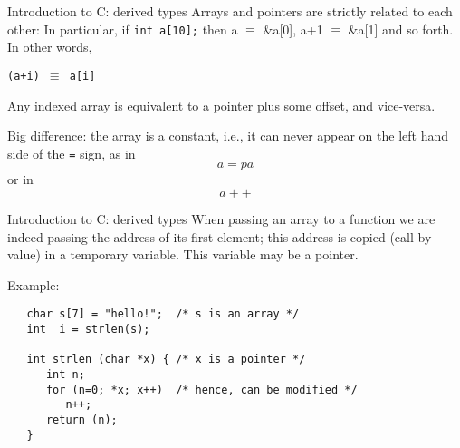 \begin{frame}[fragile]{Introduction to C: derived types}
Arrays and pointers are strictly related to each other:
In particular, if {\tt int a[10];}
then a $\equiv$ \&a[0], a+1 $\equiv$ \&a[1] and so forth.
In other words,
\begin{center}\tt *(a+i) $\equiv$ a[i] \end{center}


\vspace{20pt}

Any indexed array is equivalent to
a pointer plus some offset, and vice-versa.


\vspace{20pt}

Big difference: the array is a constant, i.e., it can never 
appear on the left hand side of the \verb"=" sign, as in
$$a=pa$$
or in
$$a++$$

\end{frame}
\begin{frame}[fragile]{Introduction to C: derived types}
When passing an array to a function
we are indeed passing the address of its first element; this
address is copied 
(call-by-value) in a temporary variable. This variable may be
a pointer.


\vspace{20pt}

Example:

\begin{verbatim}
   char s[7] = "hello!";  /* s is an array */
   int  i = strlen(s);

   int strlen (char *x) { /* x is a pointer */
      int n;
      for (n=0; *x; x++)  /* hence, can be modified */
         n++;
      return (n);
   }
\end{verbatim}



\end{frame}
